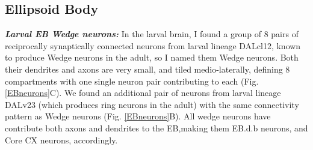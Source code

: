 


    \subsection{Ellipsoid Body}

    
    \textbf{\textit{Larval EB Wedge neurons:}}
    In the larval brain, I found a group of 8 pairs of reciprocally synaptically connected neurons from larval lineage DALcl12, known to produce Wedge neurons in the adult, so I named them Wedge neurons.
    Both their dendrites and axons are very small, and tiled medio-laterally, defining 8 compartments with one single neuron pair contributing to each (Fig. \ref{EBneurons}C).
    We found an additional pair of neurons from larval lineage DALv23 (which produces ring neurons in the adult) with the same connectivity pattern as Wedge neurons (Fig. \ref{EBneurons}B). All wedge neurons have contribute both axons and dendrites to the EB,making them EB.d.b neurons, and Core CX neurons, accordingly.

